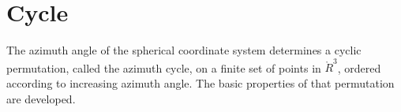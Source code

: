 %
%
%






\section{Cycle}


The azimuth angle of the spherical coordinate system
determines a cyclic permutation, called the azimuth cycle, on a finite
set of points in $\ring{R}^3$, ordered according to increasing azimuth
angle.  The basic properties of that permutation are developed.
%
%
%


